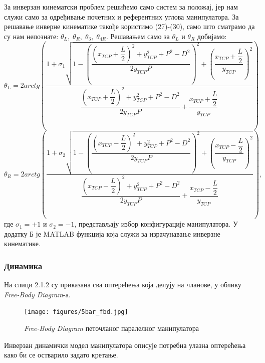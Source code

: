 \documentclass[12pt]{article}
\begin{document}
За инверзан кинематски проблем решићемо само систем за положај, јер нам служи само за одређивање почетних и референтних углова манипулатора. За решавање инверне кинематике такође користимо (27)-(30), само што сматрамо да су нам непознате: $\theta_L,\;\theta_R,\;\theta_3,\;\theta_{4R}$. Решавањем само за $\theta_L$ и $\theta_R$ добијамо:
\begin{equation}
    \theta_L = 2arctg\left(\dfrac{1 + \sigma_1\sqrt{1 - \left(\dfrac{\left(x_{TCP}+\dfrac{L}{2}\right)^2 + y_{TCP}^2 + P^2 - D^2}{2y_{TCP}P}\right)^2+\left(\dfrac{x_{TCP}+\dfrac{L}{2}}
    {y_{TCP}}\right)^2}}
    {\dfrac{\left(x_{TCP}+\dfrac{L}{2}\right)^2 + y_{TCP}^2 + P^2 - D^2}{2y_{TCP}P} + \dfrac{x_{TCP}+\dfrac{L}{2}}
    {y_{TCP}}}\right)
\end{equation}
\begin{equation}
    \theta_R = 2arctg\left(\dfrac{1 + \sigma_2\sqrt{1 - \left(\dfrac{\left(x_{TCP}-\dfrac{L}{2}\right)^2 + y_{TCP}^2 + P^2 - D^2}{2y_{TCP}P}\right)^2+\left(\dfrac{x_{TCP}-\dfrac{L}{2}}
    {y_{TCP}}\right)^2}}
    {\dfrac{\left(x_{TCP}-\dfrac{L}{2}\right)^2 + y_{TCP}^2 + P^2 - D^2}{2y_{TCP}P} + \dfrac{x_{TCP}-\dfrac{L}{2}}
    {y_{TCP}}}\right),
\end{equation}
где $\sigma_1=+1$ и $\sigma_2=-1$, представљају избор конфигурације манипулатора.
У додатку Б је MATLAB функција која служи за израчунавање инверзне кинематике.

\newpage
\subsubsection{Динамика}
На слици 2.1.2 су приказана сва оптерећења која делују на чланове, у облику \textit{Free-Body Diagram}-а.
\begin{figure}[H]
    \centering
    \texttt{[image: figures/5bar\_fbd.jpg]}
    \caption{\textit{Free-Body Diagram} петочланог паралелног манипулатора}
    \label{fig:5bar_fbd}
\end{figure}

Инверзан динамички модел манипулатора описује потребна улазна оптерећења како би се остварило задато кретање.
\end{document}

